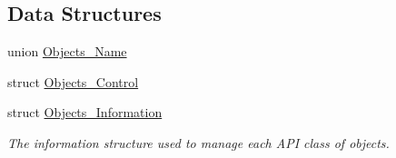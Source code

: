 \subsection*{Data Structures}
\begin{DoxyCompactItemize}
\item 
union \mbox{\hyperlink{unionObjects__Name}{Objects\+\_\+\+Name}}
\item 
struct \mbox{\hyperlink{structObjects__Control}{Objects\+\_\+\+Control}}
\item 
struct \mbox{\hyperlink{structObjects__Information}{Objects\+\_\+\+Information}}
\begin{DoxyCompactList}\small\item\em The information structure used to manage each A\+PI class of objects. \end{DoxyCompactList}\end{DoxyCompactItemize}
